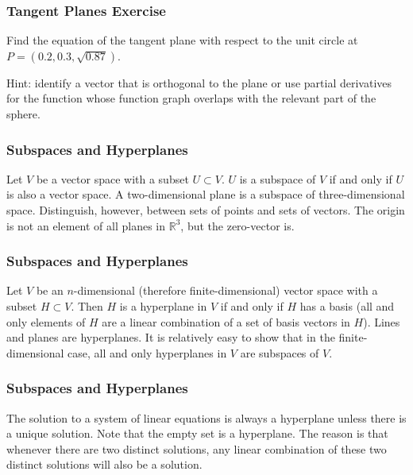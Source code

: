 \documentclass[xcolor=dvipsnames]{beamer}
\begin{document}
\begin{frame}
  \frametitle{Tangent Planes Exercise}
  {\ubung} Find the equation of the tangent plane with respect to the
  unit circle at $P=(0.2,0.3,\sqrt{0.87})$.

  \medskip

  Hint: identify a vector that is orthogonal to the plane or use
  partial derivatives for the function whose function graph overlaps
  with the relevant part of the sphere.
\end{frame}

\begin{frame}
  \frametitle{Subspaces and Hyperplanes}
  Let $V$ be a vector space with a subset $U\subset{}V$. $U$ is a
  \alert{subspace} of $V$ if and only if $U$ is also a vector space. A
  two-dimensional plane is a subspace of three-dimensional space.
  Distinguish, however, between sets of points and sets of vectors.
  The origin is not an element of all planes in $\mathbb{R}^{3}$, but
  the zero-vector is.
\end{frame}

\begin{frame}
  \frametitle{Subspaces and Hyperplanes}
  Let $V$ be an $n$-dimensional (therefore finite-dimensional) vector
  space with a subset $H\subset{}V$. Then $H$ is a \alert{hyperplane}
  in $V$ if and only if $H$ has a basis (all and only elements of $H$
  are a linear combination of a set of basis vectors in $H$). Lines
  and planes are hyperplanes. It is relatively easy to show that in
  the finite-dimensional case, all and only hyperplanes in $V$ are
  subspaces of $V$.
\end{frame}

\begin{frame}
  \frametitle{Subspaces and Hyperplanes}
The solution to a system of linear equations is always a hyperplane
unless there is a unique solution. Note that the empty set is a
hyperplane. The reason is that whenever there are two distinct
solutions, any linear combination of these two distinct solutions will
also be a solution.
\end{frame}
\end{document}
